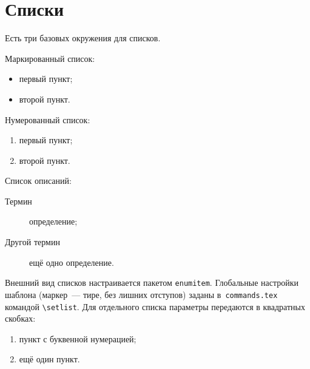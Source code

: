
\section{Списки}

Есть три базовых окружения для списков.

Маркированный список:
\begin{itemize}
    \item первый пункт;
    \item второй пункт.
\end{itemize}

Нумерованный список:
\begin{enumerate}
    \item первый пункт;
    \item второй пункт.
\end{enumerate}

Список описаний:
\begin{description}
    \item[Термин] определение;
    \item[Другой термин] ещё одно определение.
\end{description}

Внешний вид списков настраивается пакетом \texttt{enumitem}. Глобальные
настройки шаблона (маркер~--- тире, без лишних отступов) заданы
в~\texttt{commands.tex} командой \verb+\setlist+. Для отдельного списка
параметры передаются в квадратных скобках:
\begin{enumerate}[label=\alph*)]
    \item пункт с буквенной нумерацией;
    \item ещё один пункт.
\end{enumerate}
